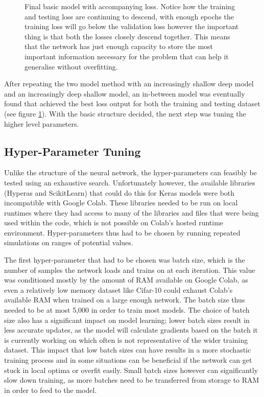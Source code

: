 \documentclass{l4proj}
\begin{document}
\begin{figure}[h]
\begin{subfigure}[b]{0.41\textwidth}
        \caption{}
    \end{subfigure} 
    \caption{Final basic model with accompanying loss. Notice how the training and testing loss are continuing to descend, with enough epochs the training loss will go below the validation loss however the important thing is that both the losses closely descend together. This means that the network has just enough capacity to store the most important information necessary for the problem that can help it generalise without overfitting.}
    \label{fig:final_basic_model}
\end{figure}

After repeating the two model method with an increasingly shallow deep model and an increasingly deep shallow model, an in-between model was eventually found that achieved the best loss output for both the training and testing dataset (see figure \ref{fig:final_basic_model}). With the basic structure decided, the next step was tuning the higher level parameters. 

\subsection{Hyper-Parameter Tuning}

Unlike the structure of the neural network, the hyper-parameters can feasibly be tested using an exhaustive search. Unfortunately however, the available libraries (Hyperas and ScikitLearn) that could do this for Keras models were both incompatible with Google Colab. These libraries needed to be run on local runtimes where they had access to many of the libraries and files that were being used within the code, which is not possible on Colab's hosted runtime environment. Hyper-parameters thus had to be chosen by running repeated simulations on ranges of potential values.

The first hyper-parameter that had to be chosen was batch size, which is the number of samples the network loads and trains on at each iteration. This value was conditioned mostly by the amount of RAM available on Google Colab, as even a relatively low memory dataset like Cifar-10 could exhaust Colab's available RAM when trained on a large enough network. The batch size thus needed to be at most 5,000 in order to train most models. The choice of batch size also has a significant impact on model learning; lower batch sizes result in less accurate updates, as the model will calculate gradients based on the batch it is currently working on which often is not representative of the wider training dataset. This impact that low batch sizes can have results in a more stochastic training process and in some situations can be beneficial if the network can get stuck in local optima or overfit easily. Small batch sizes however can significantly slow down training, as more batches need to be transferred from storage to RAM in order to feed to the model. 
\end{document}
